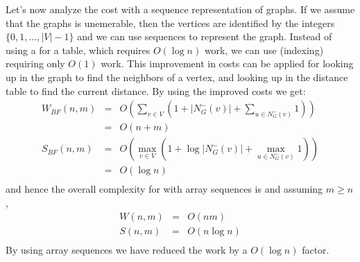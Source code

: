 Let's now analyze the cost with a sequence representation of graphs.
%
If we assume that the graphs is unemerable, then the vertices are
identified by the integers $\{0,1,\ldots,|V|-1\}$ and we can use
sequences to represent the graph. 
%
Instead of using a  for a table, which requires $O(\log
n)$ work, we can use  (indexing) requiring only $O(1)$
work.  
%
This improvement in costs can be applied for looking up in the
graph to find the neighbors of a vertex, and looking up in the
distance table to find the current distance.  By using the improved
costs we get:
\begin{eqnarray*}
W_{BF}(n,m) & = & O\left(\sum_{v \in V} \left(1 + |N_G^-(v)| + \sum_{u \in N_G^-(v)} 1\right)\right) \\
  & = & O(n+m) \\
S_{BF}(n,m) & = & O\left(\max_{v \in V} \left(1 + \log |N_G^-(v)| + \max_{u \in N_G^-(v)} 1\right)\right) \\
  & = & O(\log n) \\
\end{eqnarray*}
and hence the overall complexity for  with array
sequences is and assuming $m \ge n$,
\begin{eqnarray*}
W(n,m) & = & O(n m)\\
S(n,m) & = & O(n \log n)\\
\end{eqnarray*}
By using array sequences we have reduced
the work by a $O(\log n)$ factor.







